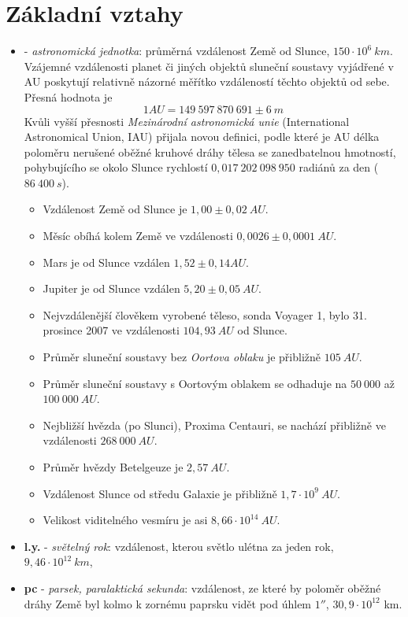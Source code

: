   \section{Základní vztahy}
    \begin{itemize}
      \item \wikiAU - \emph{astronomická jednotka}: průměrná vzdálenost Země od Slunce, $150\cdot10^6\ km$. 
      Vzájemné vzdálenosti planet či jiných objektů sluneční soustavy vy\-já\-dře\-né v AU poskytují 
      relativně názorné měřítko vzdáleností těchto objektů od sebe. Přesná hodnota je $$1 AU = 149\ 597\ 870\ 
      691 \pm 6\ m$$ Kvůli vyšší přesnosti \emph{Mezinárodní astronomická unie} (International Astronomical 
      Union, IAU) přijala novou de\-fi\-ni\-ci, podle které je AU délka poloměru nerušené oběžné kruhové 
      dráhy tělesa se zanedbatelnou hmotností, pohybujícího se okolo Slunce rychlostí $0,017\ 202\ 098\ 950$ 
      radiánů za den ($86\ 400\ s$). 
        \begin{itemize}
          \item Vzdálenost Země od Slunce je $1,00 ± 0,02\ AU$.
          \item Měsíc obíhá kolem Země ve vzdálenosti $0,0026 \pm 0,0001\ AU$.
          \item Mars je od Slunce vzdálen $1,52 \pm 0,14 AU$.
          \item Jupiter je od Slunce vzdálen $5,20 \pm 0,05\ AU$.
          \item Nejvzdálenější člověkem vyrobené těleso, sonda Voyager 1, bylo 31. prosince 2007 ve    
                vzdálenosti $104,93\ AU$ od Slunce.
          \item Průměr sluneční soustavy bez \emph{Oortova oblaku} je přibližně $105\ AU$.
          \item Průměr sluneční soustavy s Oortovým oblakem se odhaduje na $50\ 000$ až $100\ 000\ AU$.
          \item Nejbližší hvězda (po Slunci), Proxima Centauri, se nachází přibližně ve vzdálenosti 
                $268\ 000\ AU$.
          \item Průměr hvězdy Betelgeuze je $2,57\ AU$.
          \item Vzdálenost Slunce od středu Galaxie je přibližně $1,7\cdot10^9\ AU$.
          \item Velikost viditelného vesmíru je asi $8,66\cdot10^{14}\ AU$.
        \end{itemize}
      \item \textbf{l.y.} - \emph{světelný rok}: vzdálenost, kterou světlo ulétna za jeden rok, 
            $9,46\cdot10^{12}\ km$,
      \item \textbf{pc} - \emph{parsek, paralaktická sekunda}: vzdálenost, ze které by poloměr oběžné dráhy   
            Země byl kolmo k zornému paprsku vidět pod úhlem $1''$, $30,9\cdot10^{12}$ km. 
    \end{itemize}
    
